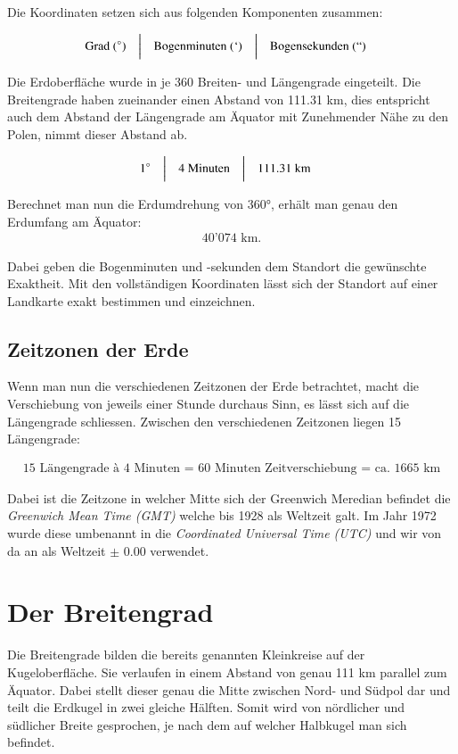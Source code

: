\begin{refsection}
Die Koordinaten setzen sich aus folgenden Komponenten zusammen:

\[
\begin{aligned}
&\text{Grad } (^{\circ})
&
&\text{\bigg \vert}
&
&\text{Bogenminuten } (`)
&
&\text{\bigg \vert}
&
&\text{Bogensekunden } (``)
\end{aligned}
\]

Die Erdoberfläche wurde in je 360 Breiten- und Längengrade eingeteilt. Die Breitengrade haben zueinander einen Abstand von 111.31 km, dies entspricht auch dem Abstand der Längengrade am Äquator mit Zunehmender Nähe zu den Polen, nimmt dieser Abstand ab.

\[
\begin{aligned}
&1^{\circ}
&
&\text{\bigg \vert}
&
&4 \text{ Minuten}
&
&\text{\bigg \vert}
&
&111.31\text{ km}
\end{aligned}
\]

Berechnet man nun die Erdumdrehung von 360°, erhält man genau den Erdumfang am Äquator: \begin{align*} 40’074 \text{ km.}\end{align*}

Dabei geben die Bogenminuten und -sekunden dem Standort die gewünschte Exaktheit. Mit den vollständigen Koordinaten lässt sich der Standort auf einer Landkarte exakt bestimmen und einzeichnen.

\subsection{Zeitzonen der Erde}
Wenn man nun die verschiedenen Zeitzonen der Erde betrachtet, macht die Verschiebung von jeweils einer Stunde durchaus Sinn, es lässt sich auf die Längengrade schliessen.
Zwischen den verschiedenen Zeitzonen liegen 15 Längengrade:

\begin{align*}
\text{15 Längengrade à 4 Minuten = 60 Minuten Zeitverschiebung = ca. 1665 km}
\end{align*}

Dabei ist die Zeitzone in welcher Mitte sich der Greenwich Meredian befindet die \textit{Greenwich Mean Time (GMT)} welche bis 1928 als Weltzeit galt. Im Jahr 1972 wurde diese umbenannt in die \textit{Coordinated Universal Time (UTC)} und wir von da an als Weltzeit $\pm$ 0.00 verwendet.


\section{Der Breitengrad}
Die Breitengrade bilden die bereits genannten Kleinkreise auf der Kugeloberfläche. Sie verlaufen in einem Abstand von genau 111 km parallel zum Äquator. Dabei stellt  dieser genau die Mitte zwischen Nord- und Südpol dar und teilt die Erdkugel in zwei gleiche Hälften. Somit wird von nördlicher und südlicher Breite gesprochen, je nach dem auf welcher Halbkugel man sich befindet.


\end{refsection}
